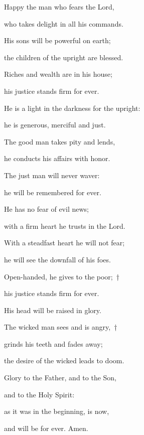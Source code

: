 \noindent Happy the man who fears the Lord,~\GreStar{}~\nopagebreak

who takes delight in all his commands.

\noindent His sons will be powerful on earth;~\GreStar{}~\nopagebreak

the children of the upright are blessed.

\noindent Riches and wealth are in his house;~\GreStar{}~\nopagebreak

his justice stands firm for ever.

\noindent He is a light in the darkness for the upright:~\GreStar{}~\nopagebreak

he is generous, merciful and just.

\noindent The good man takes pity and lends,~\GreStar{}~\nopagebreak

he conducts his affairs with honor.

\noindent The just man will never waver:~\GreStar{}~\nopagebreak

he will be remembered for ever.

\noindent He has no fear of evil news;~\GreStar{}~\nopagebreak

with a firm heart he trusts in the Lord.

\noindent With a steadfast heart he will not fear;~\GreStar{}~\nopagebreak

he will see the downfall of his foes.

\noindent Open-handed, he gives to the poor;~†~\nopagebreak

his justice stands firm for ever.~\GreStar{}~\nopagebreak

His head will be raised in glory.

\noindent The wicked man sees and is angry,~†~\nopagebreak

grinds his teeth and fades away;~\GreStar{}~\nopagebreak

the desire of the wicked leads to doom.

\noindent Glory to the Father, and to the Son,~\GreStar{}~\nopagebreak

and to the Holy Spirit:

\noindent as it was in the beginning, is now,~\GreStar{}~\nopagebreak

and will be for ever. Amen.
